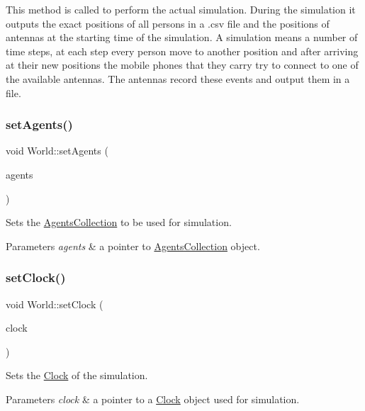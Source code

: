 This method is called to perform the actual simulation. During the simulation it outputs the exact positions of all persons in a .csv file and the positions of antennas at the starting time of the simulation. A simulation means a number of time steps, at each step every person move to another position and after arriving at their new positions the mobile phones that they carry try to connect to one of the available antennas. The antennas record these events and output them in a file. \mbox{\label{class_world_afa8e5c2943c72aa664590abbb024896b}} 
\subsubsection{\texorpdfstring{set\+Agents()}{setAgents()}}
{\footnotesize\ttfamily void World\+::set\+Agents (\begin{DoxyParamCaption}\item[{\hyperlink{class_agents_collection}{Agents\+Collection} $\ast$}]{agents }\end{DoxyParamCaption})}

Sets the \hyperlink{class_agents_collection}{Agents\+Collection} to be used for simulation. 
\begin{DoxyParams}{Parameters}
{\em agents} & a pointer to \hyperlink{class_agents_collection}{Agents\+Collection} object. \\
\hline
\end{DoxyParams}
\mbox{\label{class_world_a52ebe3eed240fe4dd37915a1dad02efd}} 
\subsubsection{\texorpdfstring{set\+Clock()}{setClock()}}
{\footnotesize\ttfamily void World\+::set\+Clock (\begin{DoxyParamCaption}\item[{\hyperlink{class_clock}{Clock} $\ast$}]{clock }\end{DoxyParamCaption})}

Sets the \hyperlink{class_clock}{Clock} of the simulation. 
\begin{DoxyParams}{Parameters}
{\em clock} & a pointer to a \hyperlink{class_clock}{Clock} object used for simulation. \\
\hline
\end{DoxyParams}
\mbox{\label{class_world_a9dc80487d5c2d1d4f2af0c1d7f015204}} 
